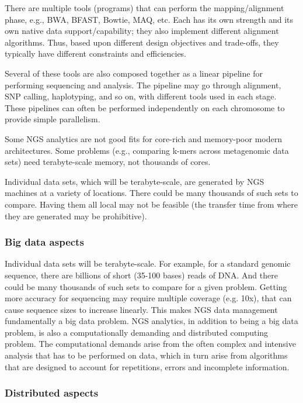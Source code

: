 There are multiple tools (programs) that can perform the mapping/alignment
phase, e.g., BWA, BFAST, Bowtie, MAQ, etc. Each has its own strength and
its own native data support/capability; they also implement
different alignment algorithms. Thus, based upon different design
objectives and trade-offs, they typically have different constraints
and efficiencies.

Several of these tools are also composed together as a linear pipeline
for performing sequencing and analysis. The pipeline may go through
alignment, SNP calling, haplotyping, and so on, with different tools
used in each stage. These pipelines can often be performed
independently on each chromosome to provide simple parallelism.

Some NGS analytics are not good fits for core-rich and memory-poor modern
architectures. Some problems (e.g., comparing k-mers across metagenomic data
sets) need terabyte-scale memory, not thousands of cores.~\cite{ngs-gap}

Individual data sets, which will be terabyte-scale, are generated by
NGS machines at a variety of locations. There could be many thousands
of such sets to compare. Having them all local may not be feasible
(the transfer time from where they are generated may be prohibitive).

\subsubsection*{Big data aspects}

Individual data sets will be terabyte-scale. For example, for a
standard genomic sequence, there are billions of short (35-100 bases)
reads of DNA.  And there could be many thousands of such sets to
compare for a given problem.  Getting more accuracy for sequencing may
require multiple coverage (e.g. 10x), that can cause sequence sizes to
increase linearly.  This makes NGS data management fundamentally a big
data problem.  NGS analytics, in addition to being a big data problem,
is also a computationally demanding and distributed computing problem.
The computational demands arise from the often complex and intensive
analysis that has to be performed on data, which in turn arise from
algorithms that are designed to account for repetitions, errors and
incomplete information.

\subsubsection*{Distributed aspects}

